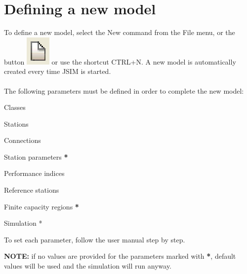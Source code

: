 \section{Defining a new model}
\label{sec:DefiningANewModel}
To define a new model, select the New command from the File menu, or the button \includegraphics[scale=.5]{img/jsim/new.eps} or use the shortcut CTRL+N. A new model is automatically created every time JSIM is started.\\\\
The following parameters must be defined in order to complete the new model:
\begin{itemize*}
\item Classes
\item Stations
\item Connections
\item Station parameters \textbf{*} 
\item Performance indices
\item Reference stations
\item Finite capacity regions \textbf{*} 
\item Simulation *
\end{itemize*}
To set each parameter, follow the user manual step by step.

\noindent \textbf{NOTE:} if no values are provided for the parameters marked with \textbf{*}, default values will be used and the simulation will run anyway.

